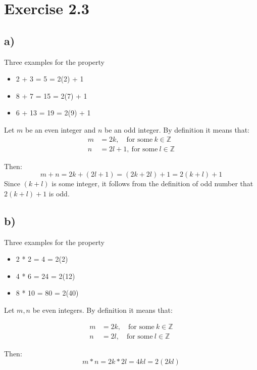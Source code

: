 \documentclass{article}
\begin{document}
\section*{Exercise 2.3}
\subsection*{a)}
Three examples for the property

\begin{itemize}
	\item 2 + 3 = 5 = 2(2) + 1
	\item 8 + 7 = 15 = 2(7) + 1
	\item 6 + 13 = 19 = 2(9) + 1
\end{itemize}

Let $m$ be an even integer and $n$ be an odd integer. By definition it means
that:
\begin{align*}
	m &= 2k, \quad \mbox{for some}\ k \in \mathbb{Z} \\	
	n &= 2l + 1, \ \mbox{for some}\ l \in \mathbb{Z}
\end{align*}

Then:
\begin{equation*}
	m + n = 2k + (2l + 1) = (2k + 2l) + 1 = 2(k+l) + 1
\end{equation*}
\noindent
Since $(k+l)$ is some integer, it follows from the definition of odd number
that $2(k+l) + 1$ is odd.

\subsection*{b)}


Three examples for the property

\begin{itemize}
	\item 2 * 2 = 4 = 2(2)
	\item 4 * 6 = 24 = 2(12)
	\item 8 * 10 = 80 = 2(40)
\end{itemize}

Let $m,n$ be even integers. By definition it means that:

\begin{align*}
	m &= 2k, \quad \mbox{for some}\ k \in \mathbb{Z} \\	
	n &= 2l, \quad \mbox{for some}\ l \in \mathbb{Z}
\end{align*}

Then:
\begin{equation*}
	m * n = 2k * 2l = 4kl = 2(2kl)
\end{equation*}
\end{document}
